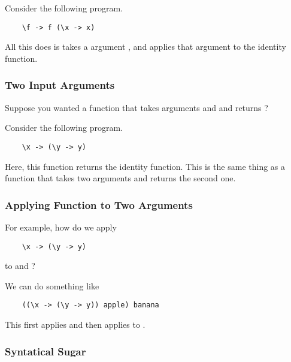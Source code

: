 \documentclass[letterpaper]{article}
\begin{document}
\bigskip 

Consider the following program.
\begin{verbatim}
    \f -> f (\x -> x)
\end{verbatim}
All this does is takes a argument , and applies that argument to the identity function. 

\subsubsection{Two Input Arguments}
Suppose you wanted a function that takes arguments  and  and returns ? 

\bigskip 

Consider the following program.
\begin{verbatim}
    \x -> (\y -> y)
\end{verbatim}
Here, this function returns the identity function. This is the same thing as a function that takes two arguments and returns the second one. 

\subsubsection{Applying Function to Two Arguments}
For example, how do we apply 
\begin{verbatim}
    \x -> (\y -> y)
\end{verbatim}
to  and ?

\bigskip 

We can do something like 
\begin{verbatim}
    ((\x -> (\y -> y)) apple) banana 
\end{verbatim}
This first applies  and then applies to . 


\subsubsection{Syntatical Sugar}
\end{document}

